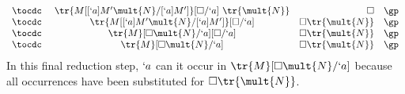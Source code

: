 \begin{Proof}
\[\begin{array}{lcrr}
  \tocdc\    & \tr{M[[`a]M'\mult{N}/[`a]M']}[\square/`a]\ \tr{\mult{N}}               & \square & \gp \\
  \tocdc\    & \tr{M[[`a]M'\mult{N}/[`a]M']}[\square/`a]                              & \square \tr{\mult{N}} & \gp \\
  \tocdc\    & \tr{M}[\square \mult{N}/`a][\square/`a]                                & \square \tr{\mult{N}} & \gp \\
  \tocdc\    & \tr{M}[\square \mult{N}/`a]                                            & \square \tr{\mult{N}} & \gp \\
\end{array}
\]
In this final reduction step, $`a$ can it occur in $\tr{M}[\square \mult{N}/`a]$ because all occurrences have been substituted for $\square \tr{\mult{N}}$.


\end{Proof}
